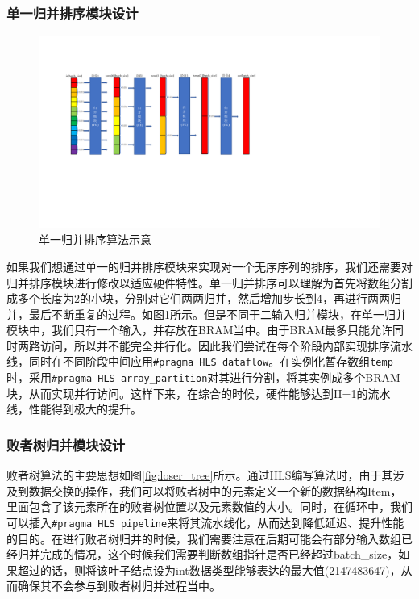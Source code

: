 \subsubsection{单一归并排序模块设计}
\begin{figure}[htbp]
    \centering
    \includegraphics[width=\linewidth]{figures/merge_sort.pdf}
    \caption{单一归并排序算法示意}
    \label{fig:merge_sort}
\end{figure}
如果我们想通过单一的归并排序模块来实现对一个无序序列的排序，我们还需要对归并排序模块进行修改以适应硬件特性。单一归并排序可以理解为首先将数组分割成多个长度为2的小块，分别对它们两两归并，然后增加步长到4，再进行两两归并，最后不断重复的过程。如图\ref{fig:merge_sort}所示。但是不同于二输入归并模块，在单一归并模块中，我们只有一个输入，并存放在BRAM当中。由于BRAM最多只能允许同时两路访问，所以并不能完全并行化。因此我们尝试在每个阶段内部实现排序流水线，同时在不同阶段中间应用\verb|#pragma HLS dataflow|。在实例化暂存数组\verb|temp|时，采用\verb|#pragma HLS array_partition|对其进行分割，将其实例成多个BRAM块，从而实现并行访问。这样下来，在综合的时候，硬件能够达到II=1的流水线，性能得到极大的提升。

\subsubsection{败者树归并模块设计}

败者树算法的主要思想如图\ref{fig:loser_tree}所示。通过HLS编写算法时，由于其涉及到数据交换的操作，我们可以将败者树中的元素定义一个新的数据结构Item，里面包含了该元素所在的败者树位置以及元素数值的大小。同时，在循环中，我们可以插入\verb|#pragma HLS pipeline|来将其流水线化，从而达到降低延迟、提升性能的目的。在进行败者树归并的时候，我们需要注意在后期可能会有部分输入数组已经归并完成的情况，这个时候我们需要判断数组指针是否已经超过batch\_size，如果超过的话，则将该叶子结点设为int数据类型能够表达的最大值(2147483647)，从而确保其不会参与到败者树归并过程当中。
